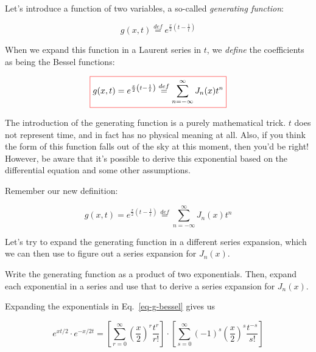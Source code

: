 Let's introduce a function of two variables, a so-called \emph{generating function}:

\begin{equation}
g(x,t) \stackrel{def}{=} e^{\frac{x}{2}\left(t-\frac{1}{t}\right)} \label{eq-gen-bessel}
\end{equation}

When we expand this function in a Laurent series in $t$, we \emph{define} the coefficients as being the Bessel functions:

\begin{equation}
\fbox{$\displaystyle
 g(x,t) = e^{\frac{x}{2}\left(t-\frac{1}{t}\right)} \stackrel{def}{=} \sum_{n = - \infty}^{\infty} J_n(x)t^n
    $}
  \label{eq-g-bessel}
\end{equation}

The introduction of the generating function is a purely mathematical trick. $t$ does not represent time, and in fact has no physical meaning at all. Also, if you think the form of this function falls out of the sky at this moment, then you'd be right! However, be aware that it's possible to derive this exponential based on the differential equation and some other assumptions.


\pagebreak


Remember our new definition: 

$$g(x,t) =  e^{\frac{x}{2}\left(t-\frac{1}{t}\right)} \stackrel{def}{=} \sum_{n = - \infty}^{\infty} J_n(x)t^n$$

Let's try to expand the generating function in a different series expansion, which we can then use to figure out a series expansion for $J_n(x)$.

\begin{cue}
Write the generating function as a product of two exponentials. Then, expand each exponential in a series and use that to derive a series expansion for $J_n(x)$.  
\end{cue}

Expanding the exponentials in Eq.~\ref{eq-g-bessel} gives us

\begin{equation}
e^{xt/2} \cdot e^{-x/2t} = \left[ \sum_{r = 0}^{\infty} {\left(\frac{x}{2}\right)}^r \frac{t^r}{r!} \right] \cdot \left [\sum_{s = 0}^{\infty} {(-1)}^s { \left(\frac{x}{2}\right)}^s \frac{t^{-s}}{s!} \right]
\end{equation} 

